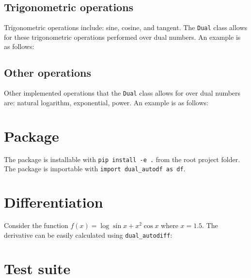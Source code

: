 \documentclass[11pt,a4paper]{article}
\begin{document}
\subsection{Trigonometric operations}
Trigonometric operations include: sine, cosine, and tangent. The \texttt{Dual} class allows for these trigonometric operations performed over dual numbers.
An example is as follows:
\subsection{Other operations}
Other implemented operations that the \texttt{Dual} class allows for over dual numbers are: natural logarithm, exponential, power.
An example is as follows:

\section{Package}
The package is installable with \texttt{pip install -e .} from the root project folder. The package is importable with \texttt{import dual\_autodf as df}.

\section{Differentiation}
Consider the function
\begin{math}
    f(x) = \log{\sin{x}} + x^2 \cos{x}
\end{math}
where $x=1.5$. The derivative can be easily calculated using \texttt{dual\_autodiff}:

\section{Test suite}
\end{document}
